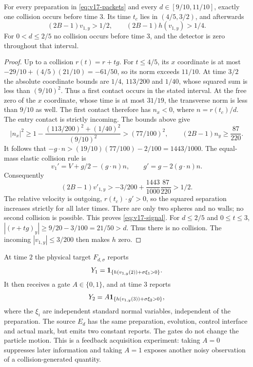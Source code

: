 \begin{lemma}
\label{lem:v17-scattering}
For every preparation in \eqref{eq:v17-packets} and every
$d\in[9/10,11/10]$, exactly one collision occurs before time $3$.
Its time $t_c$ lies in $(4/5,3/2)$, and afterwards
\begin{equation}\label{eq:v17-signal}
 (2B-1)v_{1,y}>1/2,
 \qquad (2B-1)h(v_{1,y})>1/4.
\end{equation}
For $0<d\le2/5$ no collision occurs before time $3$, and the detector
is zero throughout that interval.
\end{lemma}
\begin{proof}
Up to a collision $r(t)=r+tg$. For $t\le4/5$, its $x$ coordinate
is at most $-29/10+(4/5)(21/10)=-61/50$, so its norm exceeds
$11/10$. At time $3/2$ the absolute coordinate bounds are
$1/4$, $113/200$ and $1/40$, whose squared sum is less than
$(9/10)^2$. Thus a first contact occurs in the stated interval.
At the free zero of the $x$ coordinate, whose time is at most $31/19$,
the transverse norm is less than $9/10$ as well. The first contact
therefore has $n_x<0$, where $n=r(t_c)/d$.
The entry contact is strictly incoming. The bounds above give
\[
 |n_x|^2\ge1-
 \frac{(113/200)^2+(1/40)^2}{(9/10)^2}>(77/100)^2,
 \qquad (2B-1)n_y\ge\frac{87}{220}.
\]
It follows that $-g\cdot n> (19/10)(77/100)-2/100=1443/1000$.
The equal-mass elastic collision rule is
\[
 v_1'=V+g/2-(g\cdot n)n,
 \qquad g'=g-2(g\cdot n)n.
\]
Consequently
\[
 (2B-1)v'_{1,y}>
 -3/200+\frac{1443}{1000}\frac{87}{220}>1/2.
\]
The relative velocity is outgoing, $r(t_c)\cdot g'>0$, so the squared
separation increases strictly for all later times. There are only two
spheres and no walls; no second collision is possible. This proves
\eqref{eq:v17-signal}. For $d\le2/5$ and $0\le t\le3$,
$|(r+tg)_y|\ge9/20-3/100=21/50>d$. Thus there is no collision.
The incoming $|v_{1,y}|\le3/200$ then makes $h$ zero.
\end{proof}

At time $2$ the physical target $F_{d,\sigma}$ reports
\[
 Y_1=\mathbf 1_{\{h(v_{1,y}(2))+\sigma\xi_1>0\}}.
\]
It then receives a gate $A\in\{0,1\}$, and at time $3$ reports
\[
 Y_2=A\mathbf 1_{\{h(v_{1,y}(3))+\sigma\xi_2>0\}},
\]
where the $\xi_i$ are independent standard normal variables,
independent of the preparation. The source $E_d$ has the same
preparation, evolution, control interface and actual mark, but emits
two constant reports. The gates do not change the particle motion.
This is a feedback acquisition experiment: taking $A=0$ suppresses
later information and taking $A=1$ exposes another noisy observation
of a collision-generated quantity.

